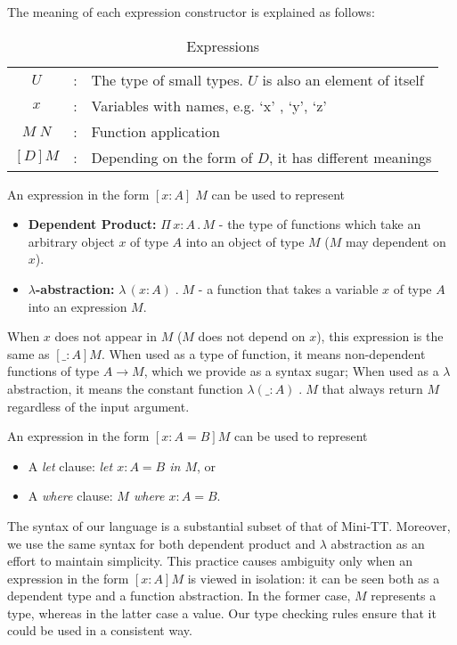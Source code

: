 \documentclass{article}
\theoremstyle{remark}
\begin{document}
The meaning of each expression constructor is explained as follows:
\begin{table}[h]
  \centering
  \begin{tabular}{c l l}
    $U$ & : & The type of small types. $U$ is also an element of itself \\
    $x$ & : & Variables with names, e.g. `x' , `y', `z' \\
    $M \; N$ & : & Function application \\
    $[D] M$ & : & Depending on the form of $D$, it has different meanings \\ 
  \end{tabular}
  \caption{Expressions}
\end{table}

An expression in the form $[x : A]\; M$ can be used to represent
\begin{itemize}
\item \textbf{Dependent Product:} $\Pi \,x : A \, . \, M$ - the type of functions which take an arbitrary object $x$ of type $A$ into an object of type $M$ ($M$ may dependent on $x$).
\item \textbf{$\lambda$-abstraction:} $\lambda\,(x : A) \; . \; M$ - a function that takes a variable $x$ of type $A$ into an expression $M$.
\end{itemize}

When $x$ does not appear in $M$ ($M$ does not depend on $x$), this expression is the same as $[\_ : A] M$. When used as a type of function, it means non-dependent functions of type $A \to M$, which we provide as a syntax sugar; When used as a $\lambda$ abstraction, it means the constant function $\lambda (\_:A) \; . \; M$ that always return $M$ regardless of the input argument.

An expression in the form $[x : A = B] M$ can be used to represent
\begin{itemize}
\item A \textit{let} clause: \textit{let $x : A = B$ in $M$}, or
\item A \textit{where} clause: \textit{$M$ where $x : A = B$}.
\end{itemize}

The syntax of our language is a substantial subset of that of Mini-TT. Moreover, we use the same syntax for both dependent product and $\lambda$ abstraction as an effort to maintain simplicity. This practice causes ambiguity only when an expression in the form $[x : A] M$ is viewed in isolation: it can be seen both as a dependent type and a function abstraction. In the former case, $M$ represents a type, whereas in the latter case a value. Our type checking rules ensure that it could be used in a consistent way.
\end{document}
